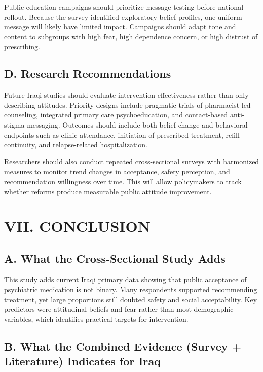 Public education campaigns should prioritize message testing before
national rollout. Because the survey identified exploratory belief
profiles, one uniform message will likely have limited impact. Campaigns
should adapt tone and content to subgroups with high fear, high
dependence concern, or high distrust of prescribing.

\subsection{D. Research
Recommendations}\label{d.-research-recommendations}

Future Iraqi studies should evaluate intervention effectiveness rather
than only describing attitudes. Priority designs include pragmatic
trials of pharmacist-led counseling, integrated primary care
psychoeducation, and contact-based anti-stigma messaging. Outcomes
should include both belief change and behavioral endpoints such as
clinic attendance, initiation of prescribed treatment, refill
continuity, and relapse-related hospitalization.

Researchers should also conduct repeated cross-sectional surveys with
harmonized measures to monitor trend changes in acceptance, safety
perception, and recommendation willingness over time. This will allow
policymakers to track whether reforms produce measurable public attitude
improvement.

\section{VII. CONCLUSION}\label{vii.-conclusion}

\subsection{A. What the Cross-Sectional Study
Adds}\label{a.-what-the-cross-sectional-study-adds}

This study adds current Iraqi primary data showing that public
acceptance of psychiatric medication is not binary. Many respondents
supported recommending treatment, yet large proportions still doubted
safety and social acceptability. Key predictors were attitudinal beliefs
and fear rather than most demographic variables, which identifies
practical targets for intervention.

\subsection{B. What the Combined Evidence (Survey + Literature)
Indicates for
Iraq}\label{b.-what-the-combined-evidence-survey-literature-indicates-for-iraq}

